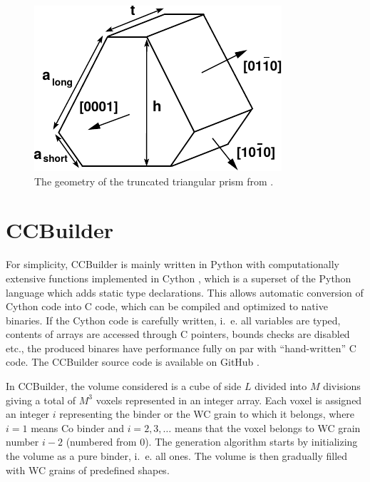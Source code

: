 \documentclass[10pt,a4paper]{article}
\begin{document}
\begin{figure}
	\begin{center}
		\includegraphics[width=.3\columnwidth]{Truncated_triangle_drawing/tt_drawing}
	\end{center}
	\caption{\label{fig:tt} The geometry of the truncated triangular prism from \cite{ChWaLaAl07}.}
\end{figure}

\section{CCBuilder}
For simplicity, CCBuilder is mainly written in Python with computationally extensive functions implemented in Cython \cite{Cython}, which is a superset of the Python language which adds static type declarations. This allows automatic conversion of Cython code into C code, which can be compiled and optimized to native binaries. If the Cython code is carefully written, i.~e. all variables are typed, contents of arrays are accessed through C pointers, bounds checks are disabled etc., the produced binares have performance fully on par with ``hand-written'' C code. The CCBuilder source code is available on GitHub \cite{CCBuilder}.

In CCBuilder, the volume considered is a cube of side $L$ divided into $M$ divisions giving a total of $M^3$ voxels represented in an integer array. Each voxel is assigned an integer $i$ representing the binder or the WC grain to which it belongs, where $i=1$ means Co binder and $i = 2, 3, \ldots$ means that the voxel belongs to WC grain number $i-2$ (numbered from $0$). The generation algorithm starts by initializing the volume as a pure binder, i.~e. all ones. The volume is then gradually filled with WC grains of predefined shapes.
\end{document}
